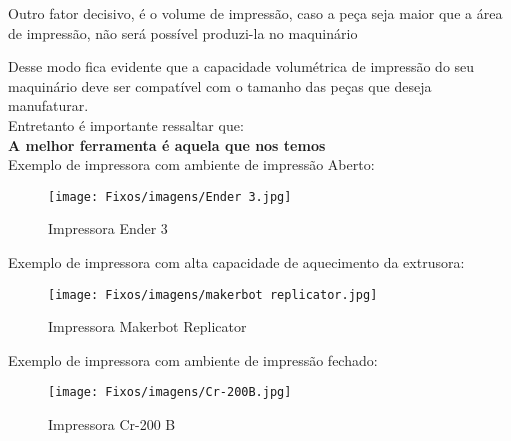 Outro fator decisivo, é o volume de impressão, caso a peça seja maior que a área de impressão, não será possível produzi-la no maquinário



Desse modo fica evidente que a capacidade volumétrica de impressão do seu maquinário deve ser compatível com o tamanho das peças que deseja manufaturar.\\[0.2cm]





Entretanto é importante ressaltar que:\\[0.4cm]

\textbf{\large A melhor ferramenta é aquela que nos temos} \\[0.3cm]



Exemplo de impressora com ambiente de impressão Aberto:\\

\begin{figure}[h!]

    \centering

    \texttt{[image: Fixos/imagens/Ender 3.jpg]}

    \caption{Impressora Ender 3}

    \label{fig:my_label}

\end{figure}



Exemplo de impressora com alta capacidade de aquecimento da extrusora:\\



\begin{figure}[h!]

    \centering

    \texttt{[image: Fixos/imagens/makerbot replicator.jpg]}

    \caption{Impressora Makerbot Replicator}

    \label{fig:my_label}

\end{figure}



Exemplo de impressora com ambiente de impressão fechado:



\begin{figure}[h!]

    \centering

    \texttt{[image: Fixos/imagens/Cr-200B.jpg]}

    \caption{Impressora Cr-200 B}

    \label{fig:my_label}

\end{figure}



